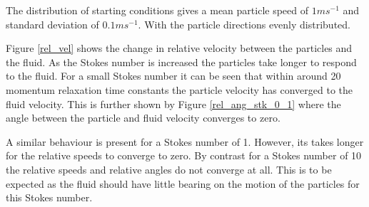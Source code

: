 \documentclass[../Interim_Report_Master]{subfiles}
\begin{document}
The distribution of starting conditions gives a mean particle speed of $1ms^{-1}$ and standard deviation of $0.1ms^{-1}$. With the particle directions evenly distributed.

Figure \ref{rel_vel} shows the change in relative velocity between the particles and the fluid. As the Stokes number is increased the particles take longer to respond to the fluid. For a small Stokes number it can be seen that within around 20 momentum relaxation time constants the particle velocity has converged to the fluid velocity. This is further shown by Figure \ref{rel_ang_stk_0_1} where the angle between the particle and fluid velocity converges to zero.

A similar behaviour is present for a Stokes number of 1. However, its takes longer for the relative speeds to converge to zero. By contrast for a Stokes number of 10 the relative speeds and relative angles do not converge at all. This is to be expected as the fluid should have little bearing on the motion of the particles for this Stokes number.
\end{document}
